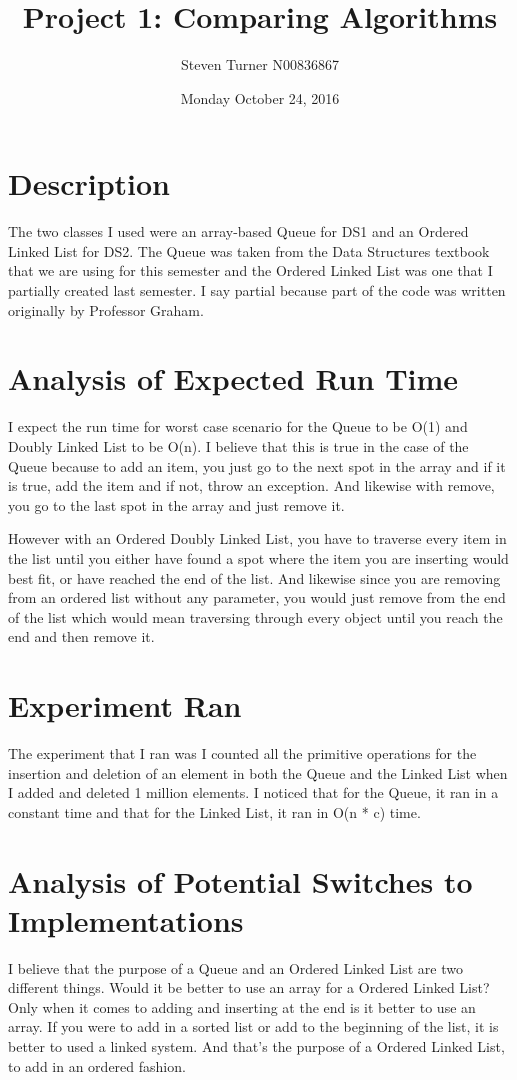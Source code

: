 \documentclass[11pt, oneside]{article}   	%
\title{Project 1: Comparing Algorithms}
\author{Steven Turner N00836867}
\date{Monday October 24, 2016}							%
\begin{document}
\maketitle
\section{Description}
The two classes I used were an array-based Queue for DS1 and an Ordered Linked List for DS2. The Queue was taken from the Data Structures textbook that we are using for this semester and the Ordered Linked List was one that I partially created last semester. I say partial because part of the code was written originally by Professor Graham.
\section{Analysis of Expected Run Time}
I expect the run time for worst case scenario for the Queue to be O(1) and Doubly Linked List to be O(n). I believe that this is true in the case of the Queue because to add an item, you just go to the next spot in the array and if it is true, add the item and if not, throw an exception. And likewise with remove, you go to the last spot in the array and just remove it.

However with an Ordered Doubly Linked List, you have to traverse every item in the list until you either have found a spot where the item you are inserting would best fit, or have reached the end of the list. And likewise since you are removing from an ordered list without any parameter, you would just remove from the end of the list which would mean traversing through every object until you reach the end and then remove it.

\section{Experiment Ran}
The experiment that I ran was I counted all the primitive operations for the insertion and deletion of an element in both the Queue and the Linked List when I added and deleted 1 million elements. I noticed that for the Queue, it ran in a constant time and that for the Linked List, it ran in O(n * c) time. 

\section{Analysis of Potential Switches to Implementations}
I believe that the purpose of a Queue and an Ordered Linked List are two different things. Would it be better to use an array for a Ordered Linked List? Only when it comes to adding and inserting at the end is it better to use an array. If you were to add in a sorted list or add to the beginning of the list, it is better to used a linked system. And that's the purpose of a Ordered Linked List, to add in an ordered fashion.
\end{document}
